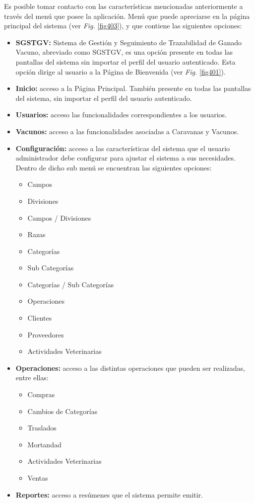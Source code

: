 \documentclass[11pt,oneside]{book}
\begin{document}
Es posible tomar contacto con las características mencionadas anteriormente a través del menú que posee la aplicación. Menú que puede apreciarse en la página principal del sistema (ver \textit{Fig.} \eqref{fig403}), y que contiene las siguientes opciones:
\begin{itemize}
\item \textbf{SGSTGV:} Sistema de Gestión y Seguimiento de Trazabilidad de Ganado Vacuno, abreviado como SGSTGV, es una opción presente en todas las pantallas del sistema sin importar el perfil del usuario autenticado. Esta opción dirige al usuario a la Página de Bienvenida (ver \textit{Fig.} \eqref{fig401}).
\item \textbf{Inicio:} acceso a la Página Principal. También presente en todas las pantallas del sistema, sin importar el perfil del usuario autenticado.
\item \textbf{Usuarios:} acceso las funcionalidades correspondientes a los usuarios.
\item \textbf{Vacunos:} acceso a las funcionalidades asociadas a Caravanas y Vacunos.
\newpage
\item \textbf{Configuración:} acceso a las características del sistema que el usuario administrador debe configurar para ajustar el sistema a sus necesidades. Dentro de dicho sub menú se encuentran las siguientes opciones:
\begin{itemize}
\item Campos
\item Divisiones
\item Campos / 	Divisiones
\item Razas
\item Categorías
\item Sub Categorías
\item Categorías / Sub Categorías
\item Operaciones
\item Clientes
\item Proveedores
\item Actividades Veterinarias
\end{itemize}
\item \textbf{Operaciones:} acceso a las distintas operaciones que pueden ser realizadas, entre ellas:
\begin{itemize}
\item Compras
\item Cambios de Categorías
\item Traslados
\item Mortandad
\item Actividades Veterinarias
\item Ventas
\end{itemize}
\item \textbf{Reportes:} acceso a resúmenes que el sistema permite emitir.
\end{itemize}
\end{document}

